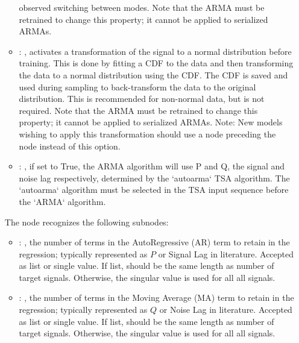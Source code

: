 \begin{itemize}
\begin{itemize}
            observed switching between modes. Note that the ARMA must be
            retrained to change this property; it cannot be applied to serialized ARMAs. 
          \item {}: , 
            activates a transformation of the signal to a normal distribution before
            training. This is done by fitting a CDF to the data and then transforming the
            data to a normal distribution using the CDF. The CDF is saved and used during
            sampling to back-transform the data to the original distribution. This is
            recommended for non-normal data, but is not required. Note that the ARMA must be
            retrained to change this property; it cannot be applied to serialized ARMAs.
            Note: New models wishing to apply this transformation should use a
             node preceding the  node instead of this
            option. 
          \item {}: , 
            if set to True, the ARMA algorithm will use P and Q, the signal and
            noise lag respectively, determined by the `autoarma` TSA algorithm.
            The `autoarma` algorithm must be selected in the TSA input sequence before
            the `ARMA` algorithm. 
      \end{itemize}

      The  node recognizes the following subnodes:
      \begin{itemize}
        \item {}: , 
          the number of terms in the AutoRegressive (AR) term to retain in the
          regression; typically represented as $P$ or Signal Lag in literature.
          Accepted as list or single value. If list, should be the same length as
          number of target signals. Otherwise, the singular value is used for all
          all signals.

        \item {}: , 
          the number of terms in the Moving Average (MA) term to retain in the
          regression; typically represented as $Q$ or Noise Lag in literature.
          Accepted as list or single value. If list, should be the same length as
          number of target signals. Otherwise, the singular value is used for all
          all signals.
      \end{itemize}


\end{itemize}
